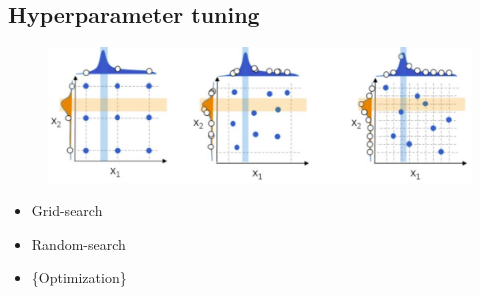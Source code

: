 \subsection{Hyperparameter tuning}
\begin{figure}[!h]
    \includegraphics[width = \columnwidth]{figures/03/Hyperparameter.png}
\end{figure}
\begin{itemize}
    \item Grid-search
    \item Random-search
    \item \{Optimization\}
\end{itemize}